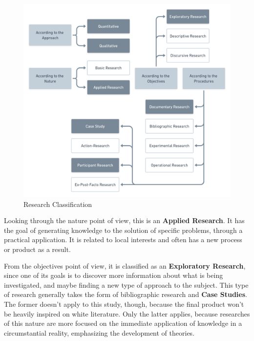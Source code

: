 \begin{figure}[htb]
    \caption{Research Classification}\label{fig:research-classification}
    \begin{center}
        \includegraphics[width=16cm]{img/Research Classification@2x.png}
    \end{center}
\end{figure}

Looking through the nature point of view, this is an \textbf{Applied Research}. It has the goal of generating knowledge to the solution of specific problems, through a practical application. It is related to local interests and often has a new process or product as a result.

From the objectives point of view, it is classified as an \textbf{Exploratory Research}, since one of its goals is to discover more information about what is being investigated, and maybe finding a new type of approach to the subject. This type of research generally takes the form of bibliographic research and \textbf{Case Studies}. The former doesn't apply to this study, though, because the final product won't be heavily inspired on white literature. Only the latter applies, because researches of this nature are more focused on the immediate application of knowledge in a circumstantial reality, emphasizing the development of theories.

